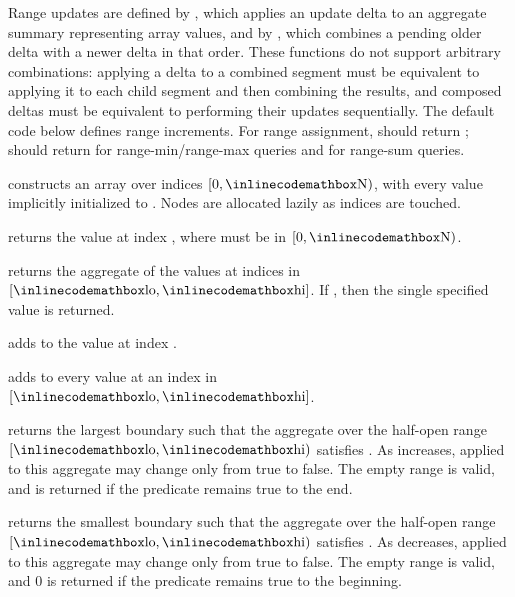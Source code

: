 Range updates are defined by , which applies an update delta  to an aggregate summary  representing  array values, and by , which combines a pending older delta with a newer delta in that order. These functions do not support arbitrary combinations: applying a delta to a combined segment must be equivalent to applying it to each child segment and then combining the results, and composed deltas must be equivalent to performing their updates sequentially. The default code below defines range increments. For range assignment,  should return ;  should return  for range-min/range-max queries and  for range-sum queries.

\begin{compactitem}
  \item {} constructs an array over indices $[0, {\inlinecodemath{N}})$, with every value implicitly initialized to . Nodes are allocated lazily as indices are touched.
  \item {} returns the value at index , where  must be in $[0, {\inlinecodemath{N}})$.
  \item {} returns the aggregate of the values at indices in $[{\inlinecodemath{lo}}, {\inlinecodemath{hi}}]$. If , then the single specified value is returned.
  \item {} adds  to the value at index .
  \item {} adds  to every value at an index in $[{\inlinecodemath{lo}}, {\inlinecodemath{hi}}]$.
  \item {} returns the largest boundary  such that the aggregate over the half-open range $[{\inlinecodemath{lo}}, {\inlinecodemath{hi}})$ satisfies . As  increases,  applied to this aggregate may change only from true to false. The empty range is valid, and  is returned if the predicate remains true to the end.
  \item {} returns the smallest boundary  such that the aggregate over the half-open range $[{\inlinecodemath{lo}}, {\inlinecodemath{hi}})$ satisfies . As  decreases,  applied to this aggregate may change only from true to false. The empty range is valid, and $0$ is returned if the predicate remains true to the beginning.
\end{compactitem}

